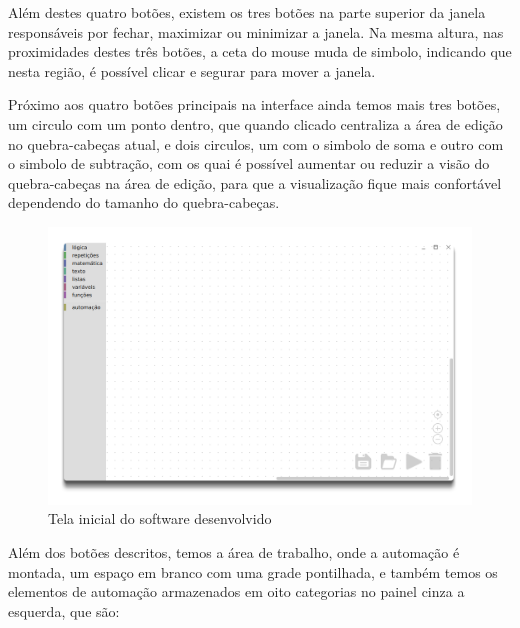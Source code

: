 \documentclass[tg]{mdtufsm}
\begin{document}
                Além destes quatro botões, existem os tres botões na parte superior da janela responsáveis por fechar, maximizar ou minimizar a janela. Na mesma altura, nas proximidades destes três botões, a ceta do mouse muda de simbolo, indicando que nesta região, é possível clicar e segurar para mover a janela.

                Próximo aos quatro botões principais na interface ainda temos mais tres botões, um circulo com um ponto dentro, que quando clicado centraliza a área de edição no quebra-cabeças atual, e dois circulos, um com o simbolo de soma e outro com o simbolo de subtração, com os quai é possível aumentar ou reduzir a visão do quebra-cabeças na área de edição, para que a visualização fique mais confortável dependendo do tamanho do quebra-cabeças.

                \begin{figure}[!htb]
                    {\centering
                    \includegraphics[width=1.0\textwidth]{imagens/app.png}
                    \caption{Tela inicial do software desenvolvido}
                    \label{fig:app}}
                \end{figure}

                Além dos botões descritos, temos a área de trabalho, onde a automação é montada, um espaço em branco com uma grade pontilhada, e também temos os elementos de automação armazenados em oito categorias no painel cinza a esquerda, que são:
\end{document}
